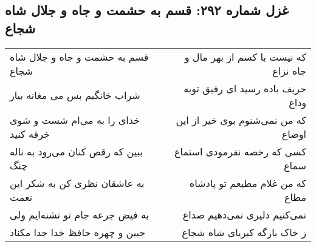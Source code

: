 \begin{center}
\section*{غزل شماره ۲۹۲: قسم به حشمت و جاه و جلال شاه شجاع}
\label{sec:sh292}
\begin{longtable}{l p{0.5cm} r}
قسم به حشمت و جاه و جلال شاه شجاع
&&
که نیست با کسم از بهر مال و جاه نزاع
\\
شراب خانگیم بس می مغانه بیار
&&
حریف باده رسید ای رفیق توبه وداع
\\
خدای را به می‌ام شست و شوی خرقه کنید
&&
که من نمی‌شنوم بوی خیر از این اوضاع
\\
ببین که رقص کنان می‌رود به ناله چنگ
&&
کسی که رخصه نفرمودی استماع سماع
\\
به عاشقان نظری کن به شکر این نعمت
&&
که من غلام مطیعم تو پادشاه مطاع
\\
به فیض جرعه جام تو تشنه‌ایم ولی
&&
نمی‌کنیم دلیری نمی‌دهیم صداع
\\
جبین و چهره حافظ خدا جدا مکناد
&&
ز خاک بارگه کبریای شاه شجاع
\\
\end{longtable}
\end{center}
